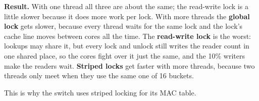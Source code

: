 \documentclass[11pt,a4paper]{article}
\begin{document}
\textbf{Result.} With one thread all three are about the same; the read-write lock
is a little slower because it does more work per lock. With more threads the
\textbf{global lock} gets slower, because every thread waits for the same lock and
the lock's cache line moves between cores all the time. The \textbf{read-write lock}
is the worst: lookups may share it, but every lock and unlock still writes the
reader count in one shared place, so the cores fight over it just the same, and the
10\% writers make the readers wait. \textbf{Striped locks} get faster with more
threads, because two threads only meet when they use the same one of 16 buckets.

This is why the switch uses striped locking for its MAC table.
\end{document}
